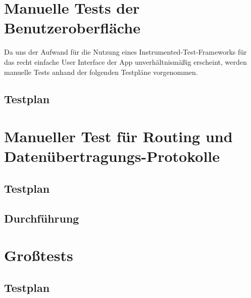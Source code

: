 




\clearpage

\section{Manuelle Tests der Benutzeroberfläche}

Da uns der Aufwand für die Nutzung eines Instrumented-Test-Frameworks
für das recht einfache User Interface der App unverhältnismäßig
erscheint, werden manuelle Tests anhand der folgenden Testpläne
vorgenommen.

\subsection{Testplan}





\clearpage
\section{Manueller Test für Routing und Datenübertragungs-Protokolle}
\subsection{Testplan}


\subsection{Durchführung}


\section{Großtests}
\subsection{Testplan}



